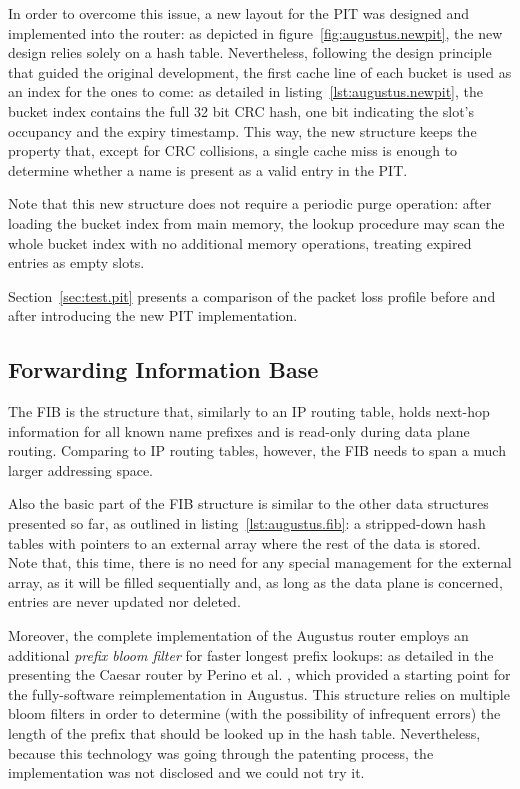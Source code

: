 \documentclass[11pt,a4paper,twoside,titlepage,openany]{book}
\begin{document}
In order to overcome this issue, a new layout for the PIT was designed and implemented into the router: as depicted in figure~\ref{fig:augustus.newpit}, the new design relies solely on a hash table. Nevertheless, following the design principle that guided the original development, the first cache line of each bucket is used as an index for the ones to come: as detailed in listing~\ref{lst:augustus.newpit}, the bucket index contains the full 32 bit CRC hash, one bit indicating the slot's occupancy and the expiry timestamp. This way, the new structure keeps the property that, except for CRC collisions, a single cache miss is enough to determine whether a name is present as a valid entry in the PIT.

Note that this new structure does not require a periodic purge operation: after loading the bucket index from main memory, the lookup procedure may scan the whole bucket index with no additional memory operations, treating expired entries as empty slots.

Section~\ref{sec:test.pit} presents a comparison of the packet loss profile before and after introducing the new PIT implementation.

\subsection{Forwarding Information Base}\label{sec:augustus.fib}
The \gls{FIB} is the structure that, similarly to an IP routing table, holds next-hop information for all known name prefixes and is read-only during data plane routing. Comparing to IP routing tables, however, the \gls{FIB} needs to span a much larger addressing space.

Also the basic part of the FIB structure is similar to the other data structures presented so far, as outlined in listing~\ref{lst:augustus.fib}: a stripped-down hash tables with pointers to an external array where the rest of the data is stored. Note that, this time, there is no need for any special management for the external array, as it will be filled sequentially and, as long as the data plane is concerned, entries are never updated nor deleted.

Moreover, the complete implementation of the Augustus router employs an additional \emph{prefix bloom filter} for faster longest prefix lookups: as detailed in the presenting the Caesar router by Perino et al. \cite{caesar}, which provided a starting point for the fully-software reimplementation in Augustus. This structure relies on multiple bloom filters in order to determine (with the possibility of infrequent errors) the length of the prefix that should be looked up in the hash table.
Nevertheless, because this technology was going through the patenting process, the implementation was not disclosed and we could not try it.
\end{document}
